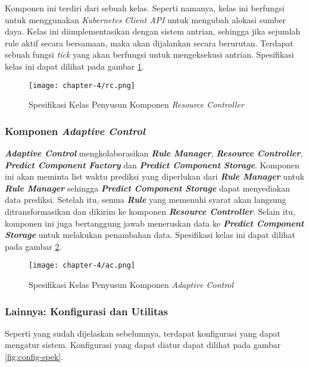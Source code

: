 Komponen ini terdiri dari sebuah kelas. Seperti namanya, kelas ini berfungsi untuk menggunakan \textit{Kubernetes Client API} untuk mengubah alokasi sumber daya. Kelas ini diimplementasikan dengan sistem antrian, sehingga jika sejumlah rule aktif secara bersamaan, maka akan dijalankan secara berurutan. Terdapat sebuah fungsi \textit{tick} yang akan berfungsi untuk mengeksekusi antrian. Spesifikasi kelas ini dapat dilihat pada gambar \ref{fig:rc-spek}.

\begin{figure}[h]
    \centering
    \texttt{[image: chapter-4/rc.png]}
    \caption{Spesifikasi Kelas Penyusun Komponen \textit{Resource Controller}}
    \label{fig:rc-spek}
\end{figure}

\subsubsection{Komponen \textit{Adaptive Control}}

\textbf{\textit{Adaptive Control}} mengkolaborasikan \textbf{\textit{Rule Manager}}, \textbf{\textit{Resource Controller}}, \textbf{\textit{Predict Component Factory}} dan \textbf{\textit{Predict Component Storage}}. Komponen ini akan meminta list waktu prediksi yang diperlukan dari \textbf{\textit{Rule Manager}} untuk \textbf{\textit{Rule Manager}} sehingga \textbf{\textit{Predict Component Storage}} dapat menyediakan data prediksi. Setelah itu, semua \textbf{\textit{Rule}} yang memenuhi syarat akan langsung ditransformasikan dan dikirim ke komponen \textbf{\textit{Resource Controller}}. Selain itu, komponen ini juga bertanggung jawab meneruskan data ke \textbf{\textit{Predict Component Storage}} untuk melakukan penambahan data. Spesifikasi kelas ini dapat dilihat pada gambar \ref{fig:ac-spek}.

\begin{figure}[h]
    \centering
    \texttt{[image: chapter-4/ac.png]}
    \caption{Spesifikasi Kelas Penyusun Komponen \textit{Adaptive Control}}
    \label{fig:ac-spek}
\end{figure}

\subsubsection{Lainnya: Konfigurasi dan Utilitas}

Seperti yang sudah dijelaskan sebelumnya, terdapat konfigurasi yang dapat mengatur sistem. Konfigurasi yang dapat diatur dapat dilihat pada gambar \ref{fig:config-spek}.

